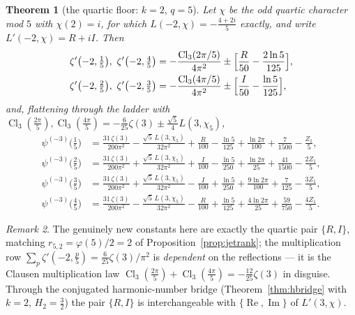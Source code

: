 \documentclass[11pt]{article}
\newtheorem{theorem}{Theorem}[section]
\theoremstyle{remark}
\newtheorem{remark}[theorem]{Remark}
\begin{document}
\begin{theorem}[the quartic floor: $k=2$, $q=5$]\label{thm:negq5k2}
Let $\chi$ be the odd quartic character mod $5$ with $\chi(2)=i$, for
which $L(-2,\chi)=-\tfrac{4+2i}5$ exactly, and write
$L'(-2,\chi)=R+iI$. Then
\begin{align*}
\zeta'\bigl(-2,\tfrac15\bigr),\ \zeta'\bigl(-2,\tfrac45\bigr)
&=-\frac{\operatorname{Cl}_3(2\pi/5)}{4\pi^2}
\pm\Bigl[\frac R{50}-\frac{2\ln5}{125}\Bigr],\\
\zeta'\bigl(-2,\tfrac25\bigr),\ \zeta'\bigl(-2,\tfrac35\bigr)
&=-\frac{\operatorname{Cl}_3(4\pi/5)}{4\pi^2}
\pm\Bigl[\frac I{50}-\frac{\ln5}{125}\Bigr],
\end{align*}
and, flattening through the ladder with
$\operatorname{Cl}_3(\tfrac{2\pi}5),\operatorname{Cl}_3(\tfrac{4\pi}5)
=-\tfrac6{25}\zeta(3)\pm\tfrac{\sqrt5}4L(3,\chi_5)$,
\begin{align*}
\psi^{(-3)}\bigl(\tfrac15\bigr)
&=\frac{31\,\zeta(3)}{200\pi^2}-\frac{\sqrt5\,L(3,\chi_5)}{32\pi^2}
+\frac R{100}-\frac{\ln5}{125}+\frac{\ln2\pi}{100}+\frac7{1500}
-\frac{Z_1}5,\\
\psi^{(-3)}\bigl(\tfrac25\bigr)
&=\frac{31\,\zeta(3)}{200\pi^2}+\frac{\sqrt5\,L(3,\chi_5)}{32\pi^2}
+\frac I{100}-\frac{\ln5}{250}+\frac{\ln2\pi}{25}+\frac{41}{1500}
-\frac{2Z_1}5,\\
\psi^{(-3)}\bigl(\tfrac35\bigr)
&=\frac{31\,\zeta(3)}{200\pi^2}+\frac{\sqrt5\,L(3,\chi_5)}{32\pi^2}
-\frac I{100}+\frac{\ln5}{250}+\frac{9\ln2\pi}{100}+\frac7{125}
-\frac{3Z_1}5,\\
\psi^{(-3)}\bigl(\tfrac45\bigr)
&=\frac{31\,\zeta(3)}{200\pi^2}-\frac{\sqrt5\,L(3,\chi_5)}{32\pi^2}
-\frac R{100}+\frac{\ln5}{125}+\frac{4\ln2\pi}{25}+\frac{59}{750}
-\frac{4Z_1}5.
\end{align*}
\end{theorem}

\begin{remark}
The genuinely new constants here are exactly the quartic pair $\{R,I\}$,
matching $r_{5,2}=\varphi(5)/2=2$ of Proposition~\ref{prop:jetrank}; the
multiplication row $\sum_p\zeta'(-2,\tfrac p5)=\tfrac6{25}\zeta(3)/\pi^2$
is \emph{dependent} on the reflections — it is the Clausen multiplication
law $\operatorname{Cl}_3(\tfrac{2\pi}5)
+\operatorname{Cl}_3(\tfrac{4\pi}5)=-\tfrac{12}{25}\zeta(3)$ in disguise.
Through the conjugated harmonic-number bridge
(Theorem~\ref{thm:hbridge} with $k=2$, $H_2=\tfrac32$) the pair $\{R,I\}$
is interchangeable with $\{\operatorname{Re},\operatorname{Im}\}$ of
$L'(3,\chi)$.
\end{remark}
\end{document}
